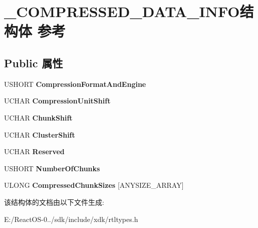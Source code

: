 \hypertarget{struct___c_o_m_p_r_e_s_s_e_d___d_a_t_a___i_n_f_o}{}\section{\+\_\+\+C\+O\+M\+P\+R\+E\+S\+S\+E\+D\+\_\+\+D\+A\+T\+A\+\_\+\+I\+N\+F\+O结构体 参考}
\label{struct___c_o_m_p_r_e_s_s_e_d___d_a_t_a___i_n_f_o}
\subsection*{Public 属性}
\begin{DoxyCompactItemize}
\item 
\mbox{\label{struct___c_o_m_p_r_e_s_s_e_d___d_a_t_a___i_n_f_o_a8df31210773cfda23643c18f9254baa0}} 
U\+S\+H\+O\+RT {\bfseries Compression\+Format\+And\+Engine}
\item 
\mbox{\label{struct___c_o_m_p_r_e_s_s_e_d___d_a_t_a___i_n_f_o_a0d1629f63291eea05f1331cb4cfbe3e3}} 
U\+C\+H\+AR {\bfseries Compression\+Unit\+Shift}
\item 
\mbox{\label{struct___c_o_m_p_r_e_s_s_e_d___d_a_t_a___i_n_f_o_a42d806712ca43613083606b0402b59e1}} 
U\+C\+H\+AR {\bfseries Chunk\+Shift}
\item 
\mbox{\label{struct___c_o_m_p_r_e_s_s_e_d___d_a_t_a___i_n_f_o_aa508490ced69116376b8b9d151fb6efb}} 
U\+C\+H\+AR {\bfseries Cluster\+Shift}
\item 
\mbox{\label{struct___c_o_m_p_r_e_s_s_e_d___d_a_t_a___i_n_f_o_aae6515b33b3ebf46c0194b486934e1bc}} 
U\+C\+H\+AR {\bfseries Reserved}
\item 
\mbox{\label{struct___c_o_m_p_r_e_s_s_e_d___d_a_t_a___i_n_f_o_afc3f9312ca3f10c20dfed19eafb62560}} 
U\+S\+H\+O\+RT {\bfseries Number\+Of\+Chunks}
\item 
\mbox{\label{struct___c_o_m_p_r_e_s_s_e_d___d_a_t_a___i_n_f_o_aa28414a7e98a0cb7cfbb676605990534}} 
U\+L\+O\+NG {\bfseries Compressed\+Chunk\+Sizes} \mbox{[}A\+N\+Y\+S\+I\+Z\+E\+\_\+\+A\+R\+R\+AY\mbox{]}
\end{DoxyCompactItemize}


该结构体的文档由以下文件生成\+:\begin{DoxyCompactItemize}
\item 
E\+:/\+React\+O\+S-\/0../sdk/include/xdk/rtltypes.\+h\end{DoxyCompactItemize}
